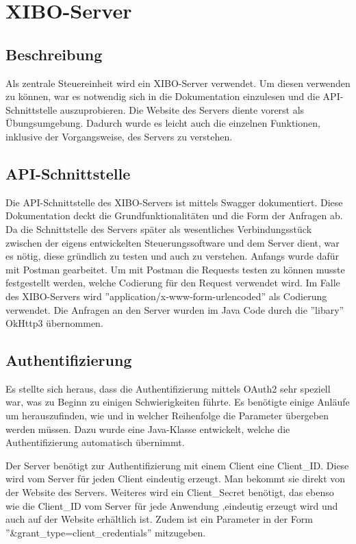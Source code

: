 \chapter{XIBO-Server}
\section{Beschreibung}
Als zentrale Steuereinheit wird ein XIBO-Server verwendet. Um diesen verwenden zu können, war es notwendig sich in die Dokumentation einzulesen und die API-Schnittstelle auszuprobieren. Die Website des Servers diente vorerst als Übungsumgebung. Dadurch wurde es leicht auch die einzelnen Funktionen, inklusive der Vorgangsweise, des Servers zu verstehen.
\cite{xibo-server}

\section{API-Schnittstelle}
Die API-Schnittstelle des XIBO-Servers ist mittels Swagger dokumentiert. Diese Dokumentation deckt die Grundfunktionalitäten und die Form der Anfragen ab. Da die Schnittstelle des Servers später als wesentliches Verbindungsstück zwischen der eigens entwickelten Steuerungssoftware und dem Server dient, war es nötig, diese gründlich zu testen und auch zu verstehen. Anfangs wurde dafür mit Postman gearbeitet. Um mit Postman die Requests testen zu können musste festgestellt werden, welche Codierung für den Request verwendet wird. Im Falle des XIBO-Servers wird ''application/x-www-form-urlencoded'' als Codierung verwendet. Die Anfragen an den Server wurden im Java Code durch die ''libary'' OkHttp3 übernommen.
\cite{swagger}
\cite{postman}
\cite{Okhttp3}


\section{Authentifizierung}
Es stellte sich heraus, dass die Authentifizierung mittels OAuth2 sehr speziell war, was zu Beginn zu einigen Schwierigkeiten führte. Es benötigte einige Anläufe  um herauszufinden, wie und in welcher Reihenfolge die Parameter übergeben werden müssen. Dazu wurde eine Java-Klasse entwickelt, welche die Authentifizierung automatisch übernimmt.
\cite{oAuth2}


Der Server benötigt zur Authentifizierung mit einem Client eine Client\_ID. Diese wird vom Server für jeden Client eindeutig erzeugt. Man bekommt sie direkt von der Website des Servers. 
Weiteres wird ein Client\_Secret benötigt, das ebenso wie die Client\_ID vom Server für jede Anwendung ,eindeutig erzeugt wird und auch auf der Website erhältlich ist. Zudem ist ein Parameter in der Form ''&grant\_type=client\_credentials'' mitzugeben.

